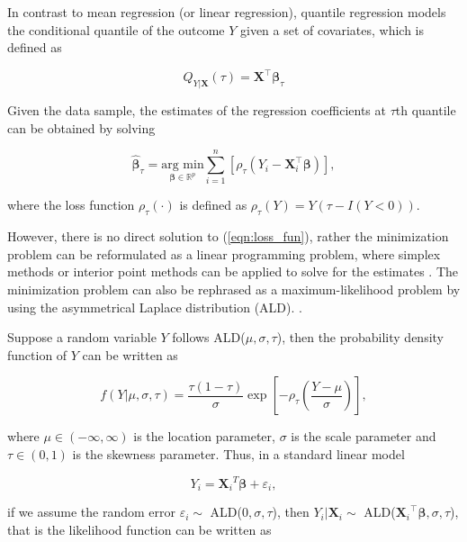 In contrast to mean regression (or linear regression), quantile regression models the conditional quantile of the outcome $Y$ given a set of covariates, which is defined as

\begin{equation}\label{eqn:lqr}
Q_{Y|{\boldsymbol X}}(\tau)={\boldsymbol X}^{\top}\boldsymbol{\beta}_{\tau}
\end{equation}

Given the data sample, the estimates of the regression coefficients at $\tau$th quantile can be obtained by solving 

\begin{equation}\label{eqn:loss_fun}
\hat{\boldsymbol{\beta}}_{\tau}=\underset{\boldsymbol{\beta}\in \mathbb{R}^{p}}{\mbox{arg min}}\sum_{i=1}^{n}\left[\rho_{\tau}(Y_{i}-{\boldsymbol X}_i^{\top}\boldsymbol{\beta})\right],
\end{equation}

where the loss function $\rho_{\tau}(\cdot)$ is defined as $\rho_{\tau}(Y)=Y(\tau-{I}{(Y<0)}).$ \par

However, there is no direct solution to (\ref{eqn:loss_fun}), rather the minimization problem can be reformulated as a linear programming problem, where simplex methods or interior point methods can be applied to solve for the estimates \citep{koenker2005quantile}. The minimization problem can also be rephrased as a maximum-likelihood problem by using the asymmetrical Laplace distribution (ALD). \citep{koenker1999goodness,yu2001bayesian}.\par


Suppose a random variable $Y$ follows ALD($\mu, \sigma, \tau$), then the probability density function of $Y$ can be written as

\begin{equation}\label{eqn:ald}
f(Y|\mu, \sigma, \tau)=\frac{\tau(1-\tau)}{\sigma}\exp\left[-\rho_{\tau}\left(\frac{Y-\mu}{\sigma}\right)\right],
\end{equation}

where $\mu\in(-\infty, \infty)$ is the location parameter, $\sigma$ is the scale parameter and $\tau\in(0, 1)$ is the skewness parameter. Thus, in a standard linear model

\begin{equation}\label{eqn:lm}
Y_i={\boldsymbol X_i}^{T}\boldsymbol{\beta}+\varepsilon_i,
\end{equation}

if we assume the random error $\varepsilon_i\sim$ ALD($0, \sigma, \tau$), then $Y_i|{\boldsymbol X}_i\sim$
ALD(${\boldsymbol X_i}^{\top}\boldsymbol{\beta}, \sigma, \tau$), that is the likelihood function can be written as

